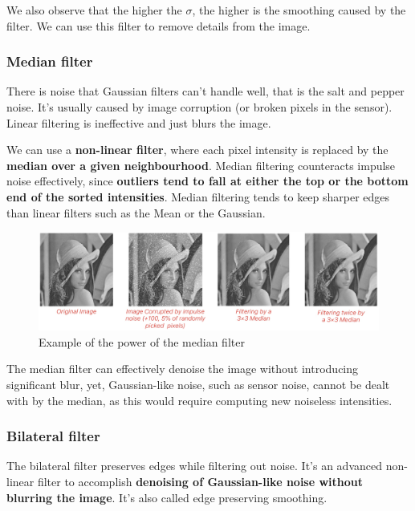 \documentclass{article}
\begin{document}
We also observe that the higher the $\sigma$, the higher is the smoothing caused by the filter.
We can use this filter to remove details from the image.

\subsubsection{Median filter}

There is noise that Gaussian filters can't handle well, that is the salt and pepper noise. It's usually caused by image corruption (or broken pixels in the sensor).
Linear filtering is ineffective and just blurs the image.

We can use a \textbf{non-linear filter}, where each pixel intensity is replaced by the \textbf{median over a given neighbourhood}.
Median filtering counteracts impulse noise effectively, since \textbf{outliers tend to fall at either the top or the bottom end of the sorted intensities}.
Median filtering tends to keep sharper edges than linear filters such as the Mean or the Gaussian.

\begin{figure}[htbp]
  \centering
  \includegraphics[width=0.9\linewidth]{./img/median_filter_application.jpg}
  \caption{Example of the power of the median filter}
  \label{fig:median_filter_application}
\end{figure}

The median filter can effectively denoise the image without introducing significant blur, yet, Gaussian-like noise, such as sensor noise, cannot be dealt with by the median, as this would require computing new noiseless intensities.

\subsubsection{Bilateral filter}

The bilateral filter preserves edges while filtering out noise.
It's an advanced non-linear filter to accomplish \textbf{denoising of Gaussian-like noise without blurring the image}.
It's also called edge preserving smoothing.
\end{document}

